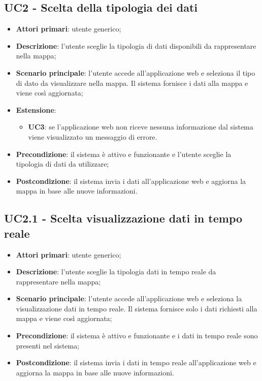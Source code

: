 \subsection{UC2 - Scelta della tipologia dei dati}
\begin{itemize}
	\item \textbf{Attori primari}: utente generico;
	\item \textbf{Descrizione}: l'utente sceglie la tipologia di dati disponibili da rappresentare nella mappa;
	\item \textbf{Scenario principale}: l'utente accede all'applicazione web e seleziona il tipo di dato da visualizzare nella mappa. Il sistema fornisce i dati alla mappa e viene così aggiornata;
	\item \textbf{Estensione}: 
	\begin{itemize}
		\item \textbf{UC3}: se l'applicazione web non riceve nessuna informazione dal sistema viene visualizzato un messaggio di errore.
	\end{itemize}
	\item \textbf{Precondizione}: il sistema è attivo e funzionante e l'utente sceglie la tipologia di dati da utilizzare;
	\item \textbf{Postcondizione}: il sistema invia i dati all'applicazione web e aggiorna la mappa in base alle nuove informazioni.
\end{itemize}

\subsection{UC2.1 - Scelta visualizzazione dati in tempo reale}
\begin{itemize}
	\item \textbf{Attori primari}: utente generico;
	\item \textbf{Descrizione}: l'utente sceglie la tipologia dati in tempo reale da rappresentare nella mappa;
	\item \textbf{Scenario principale}: l'utente accede all'applicazione web e seleziona la visualizzazione dati in tempo reale. Il sistema fornisce solo i dati richiesti alla mappa e viene così aggiornata;
	\item \textbf{Precondizione}: il sistema è attivo e funzionante e i dati in tempo reale sono presenti nel sistema;
	\item \textbf{Postcondizione}: il sistema invia i dati in tempo reale all'applicazione web e aggiorna la mappa in base alle nuove informazioni.
\end{itemize}

